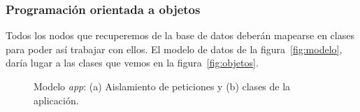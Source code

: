 \subsubsection*{Programación orientada a objetos}
Todos los nodos que recuperemos de la base de datos deberán mapearse en clases para poder así trabajar con ellos. El modelo de datos de la figura~\ref{fig:modelo}, daría lugar a las clases que vemos en la figura~\ref{fig:objetos}.

\begin{figure}[tbp]
\centering
{}
\caption{Modelo \textit{app}: (a) Aislamiento de peticiones y (b) clases de la aplicación.}
\end{figure}

